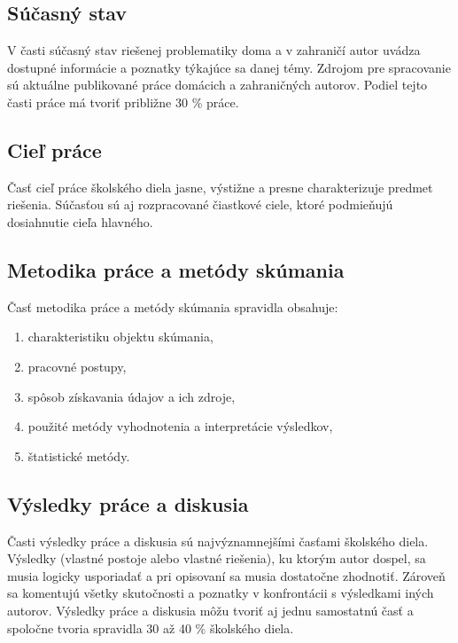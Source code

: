 \subsection{Súčasný stav}
V časti súčasný stav riešenej problematiky doma a v zahraničí autor uvádza 
dostupné informácie a poznatky týkajúce sa danej témy. Zdrojom pre spracovanie sú 
aktuálne publikované práce domácich a zahraničných autorov.  Podiel tejto časti práce 
má tvoriť približne 30 \% práce.

\subsection{Cieľ práce}
Časť cieľ práce  školského diela jasne, výstižne a presne charakterizuje predmet 
riešenia. Súčasťou sú aj rozpracované čiastkové ciele, ktoré podmieňujú dosiahnutie 
cieľa hlavného. 

\subsection{Metodika práce a metódy skúmania}
Časť metodika práce a metódy skúmania spravidla obsahuje:
\begin{enumerate}
\item  charakteristiku objektu skúmania,  
\item  pracovné postupy, 
\item  spôsob získavania údajov a ich zdroje, 
\item  použité metódy vyhodnotenia a interpretácie výsledkov,
\item  štatistické metódy.
\end{enumerate}

\subsection{Výsledky práce a diskusia}
Časti výsledky práce a diskusia sú najvýznamnejšími  časťami  školského diela. 
Výsledky (vlastné postoje alebo vlastné riešenia), ku ktorým autor dospel, sa musia 
logicky usporiadať a pri opisovaní sa musia dostatočne zhodnotiť. Zároveň sa 
komentujú všetky skutočnosti a poznatky v konfrontácii s výsledkami iných autorov. 
Výsledky práce a diskusia môžu tvoriť aj jednu samostatnú časť  a spoločne tvoria 
spravidla 30 až 40 \% školského diela.  

